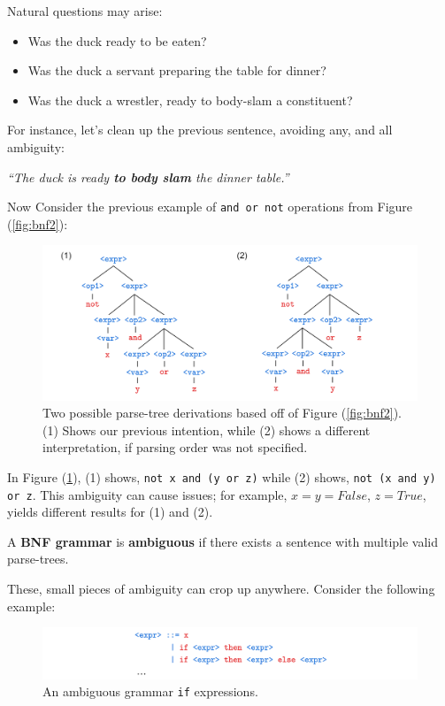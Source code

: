 \noindent
Natural questions may arise:
\begin{itemize}
    \item Was the duck ready to be eaten?
    \item Was the duck a servant preparing the table for dinner?
    \item Was the duck a wrestler, ready to body-slam a constituent?
\end{itemize}
\noindent
For instance, let's clean up the previous sentence, avoiding any, and all ambiguity:
\begin{center}
    \textit
    {``The duck is ready \textbf{to body slam} the dinner table.''}
\end{center}
\noindent
Now Consider the previous example of \texttt{and or not} operations from Figure (\ref{fig:bnf2}):
\begin{figure}[h]
    \centering
    \includegraphics[width=1\textwidth]{Sections/Formal/amb.png}
    \caption{Two possible parse-tree derivations based off of Figure (\ref{fig:bnf2}). (1) Shows our previous intention, while (2) shows a different interpretation, if parsing order was not specified.}
    \label{fig:amb}
\end{figure}

\newpage

\noindent
In Figure (\ref{fig:amb}), (1) shows, \texttt{\textcolor{Wine}{not x and (y or z)}} while (2) shows, \texttt{\textcolor{Wine}{not (x and y) or z}}. This ambiguity can cause issues; for example, 
$x=y=False$, $z=True$, yields different results for (1) and (2). \\

\begin{Def}

    A \textbf{BNF grammar} is \textbf{ambiguous} if there exists a sentence with multiple valid parse-trees.
\end{Def}
    
\noindent
These, small pieces of ambiguity can crop up anywhere. Consider the following example:
\begin{figure}[h]
    \centering
    \includegraphics[width=1\textwidth]{Sections/Formal/amb2.png}
    \caption{An ambiguous grammar \texttt{if} expressions.}
    \label{fig:amb2}
\end{figure}

